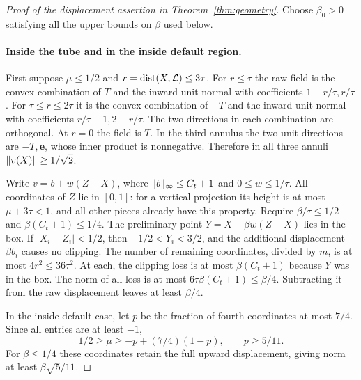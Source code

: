 \begin{proof}[Proof of the displacement assertion in Theorem~\ref{thm:geometry}]
Choose $\beta_0>0$ satisfying all the upper bounds on $\beta$ used below.
\paragraph{Inside the tube and in the inside default region.}
First suppose $\mu\le1/2$ and $r=\operatorname{dist}(X,\mathcal L)\le3\tau$.
For $r\le\tau$ the raw field is the convex combination of $T$ and
the inward unit normal with coefficients $1-r/\tau,r/\tau$.
For $\tau\le r\le2\tau$ it is the convex combination of $-T$ and
the inward unit normal with coefficients $r/\tau-1,2-r/\tau$.
The two directions in each combination are orthogonal. At $r=0$
the field is $T$. In the third annulus the two unit directions are
$-T,\mathbf e$, whose inner product is nonnegative. Therefore in all
three annuli $\lVert v(X)\rVert\ge1/\sqrt2$.

Write $v=b+w(Z-X)$, where $\lVert b\rVert_\infty\le C_t+1$ and
$0\le w\le1/\tau$. All coordinates of $Z$ lie in $[0,1]$: for a
vertical projection its height is at most $\mu+3\tau<1$, and all
other pieces already have this property. Require
$\beta/\tau\le1/2$ and $\beta(C_t+1)\le1/4$.
The preliminary point $Y=X+\beta w(Z-X)$ lies in the box. If
$|X_i-Z_i|<1/2$, then $-1/2<Y_i<3/2$, and the additional displacement
$\beta b_i$ causes no clipping. The number of remaining coordinates,
divided by $m$, is at most $4r^2\le36\tau^2$. At each, the clipping
loss is at most $\beta(C_t+1)$ because $Y$ was in the box. The norm of
all loss is at most $6\tau\beta(C_t+1)\le\beta/4$. Subtracting it
from the raw displacement leaves at least $\beta/4$.

In the inside default case, let $p$ be the fraction of fourth coordinates
at most $7/4$. Since all entries are at least $-1$,
\[
 1/2\ge\mu\ge-p+(7/4)(1-p),\qquad p\ge5/11.
\]
For $\beta\le1/4$ these coordinates retain the full upward displacement,
giving norm at least $\beta\sqrt{5/11}$.


\end{proof}
